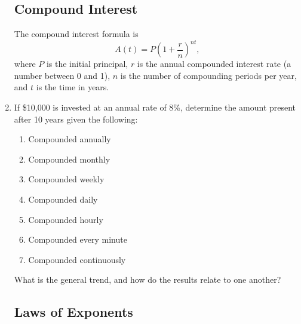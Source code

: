 \begin{enumerate}
\clearpage
\subsection{Compound Interest}


\noindent The compound interest formula is
$$A(t)=P\left(1+\frac{r}{n}\right) ^{nt},$$
where $P$ is the initial principal, $r$ is the annual compounded
interest rate (a number between 0 and 1), $n$ is the number of
compounding periods per year, and $t$ is the time in years.

\item If \$10,000 is invested at an annual rate of 8\%, determine the
  amount present after 10 years given the following:

\begin{enumerate}
\item Compounded annually\vfill
\item Compounded monthly \vfill
\item Compounded weekly \vfill
\item Compounded daily \vfill
\item Compounded hourly \vfill
\item Compounded every minute \vfill
\item Compounded continuously\vfill
\end{enumerate}

What is the general trend, and how do the results relate to one
another?

\clearpage

\subsection{Laws of Exponents} ~

\noindent
{}




\end{enumerate}
